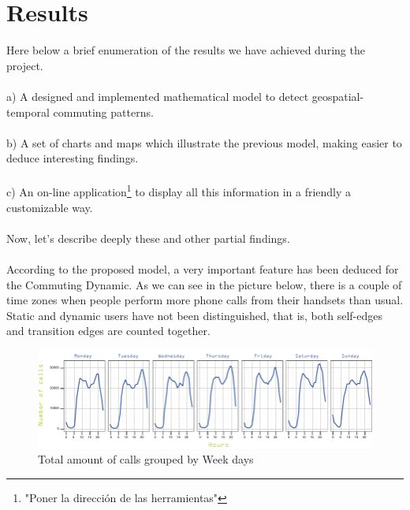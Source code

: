 \newpage
\section{Results}

Here below a brief enumeration of the results we have achieved during the project.
\\
\\
a) A designed and implemented mathematical model to detect geospatial-temporal commuting patterns.
\\
\\
b) A set of charts and maps which illustrate the previous model, making easier to deduce interesting findings.
\\
\\
c) An on-line application\footnote{"Poner la dirección de las herramientas"} to display all this information in a friendly a customizable way.
\\
\\
Now, let's describe deeply these and other partial findings.
\\
\\
According to the proposed model, a very important feature has been deduced for the Commuting Dynamic. As we can see in the picture below, there is a couple of time zones when people perform more phone calls from their handsets than usual. Static and dynamic users have not been distinguished, that is, both self-edges and transition edges are counted together.

\begin{figure}[h]
\begin{center}
\includegraphics[scale =1.1] {results/images/calls_number.pdf}
\caption{Total amount of calls grouped by Week days}
\label{fig:count_calls}
\end{center}
\end{figure}


